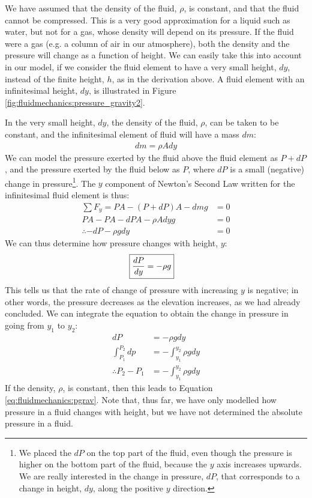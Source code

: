 We have assumed that the density of the fluid, $\rho$, is constant, and that the fluid cannot be compressed. This is a very good approximation for a liquid such as water, but not for a gas, whose density will depend on its pressure. If the fluid were a gas (e.g. a column of air in our atmosphere), both the density and the pressure will change as a function of height. We can easily take this into account in our model, if we consider the fluid element to have a very small height, $dy$, instead of the finite height, $h$, as in the derivation above. A fluid element with an infinitesimal height, $dy$, is illustrated in Figure \ref{fig:fluidmechanics:pressure_gravity2}.

In the very small height, $dy$, the density of the fluid, $\rho$, can be taken to be constant, and the infinitesimal element of fluid will have a mass $dm$:
\begin{align*}
dm = \rho A dy
\end{align*}
We can model the pressure exerted by the fluid above the fluid element as $P+dP$, and the pressure exerted by the fluid below as $P$, where $dP$ is a small (negative) change in pressure\footnote{We placed the $dP$ on the top part of the fluid, even though the pressure is higher on the bottom part of the fluid, because the $y$ axis increases upwards. We are really interested in the change in pressure, $dP$, that corresponds to a change in height, $dy$, along the positive $y$ direction. }. The $y$ component of Newton's Second Law written for the infinitesimal fluid element is thus:
\begin{align*}
\sum F_y = PA - (P+dP)A -dm g &=0\\
PA -PA -dPA - \rho A dy g &=0\\
\therefore -dP -\rho gdy &=0
\end{align*}
We can thus determine how pressure changes with height, $y$:
\begin{align}
\Aboxed{\frac{dP}{dy} &= -\rho g}
\end{align}
This tells us that the rate of change of pressure with increasing $y$ is negative; in other words, the pressure decreases as the elevation increases, as we had already concluded. We can integrate the equation to obtain the change in pressure in going from $y_1$ to $y_2$:
\begin{align*}
dP &= -\rho g dy\\
\int_{P_1}^{P_2} dp&=-\int_{y_1}^{y_2}\rho gdy\\
\therefore P_2-P_1 &=-\int_{y_1}^{y_2}\rho gdy
\end{align*}
If the density, $\rho$, is constant, then this leads to Equation \ref{eq:fluidmechanics:pgrav}. Note that, thus far, we have only modelled how pressure in a fluid changes with height, but we have not determined the absolute pressure in a fluid. 

